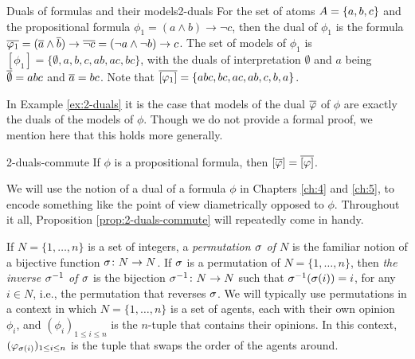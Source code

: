 \begin{xmpl}{Duals of formulas and their models}{2-duals}
	For the set of atoms $A=\{{a,b,c}\}$ and 
	the propositional formula $\phi_1 = (a\land b)\rightarrow\lnot c$, 
	then the dual of $\phi_1$ is the formula
	$\overline{\varphi_1} = (\overline{a}\land\overline{b})\rightarrow\overline{\lnot c} = (\lnot a \land \lnot b)\rightarrow c$.
	The set of models of $\phi_1$ is $[\phi_1]=\{\emptyset,a,b,c,ab,ac,bc\}$,
	with the duals of interpretation $\emptyset$ and $a$ being
	$\overline{\emptyset}=abc$ and
	$\overline{a} = bc$.
	Note that $\overline{[\varphi_1]}=\{abc,bc,ac,ab,c,b,a\}$.
\end{xmpl}

In Example \ref{ex:2-duals} it is the case 
that models of the dual $\overline{\varphi}$ of $\phi$
are exactly the duals of the models of $\phi$.
Though we do not provide a formal proof, 
we mention here that this holds more generally.

\begin{prp}{}{2-duals-commute}
	If $\phi$ is a propositional formula, then $[\overline{\varphi}] = \overline{[\varphi]}$.
\end{prp}

We will use the notion of a dual of a formula $\phi$ in 
Chapters \ref{ch:4} and \ref{ch:5}, to encode something like 
the point of view diametrically opposed to $\phi$. 
Throughout it all, Proposition \ref{prop:2-duals-commute}
will repeatedly come in handy.

If $N=\{1,\dots,n\}$ is a set of integers, a \emph{permutation $\sigma$ of $N$} 
is the familiar notion of a bijective function $\sigma\colon N\rightarrow N$.
If $\sigma$ is a permutation of $N=\{1,\dots,n\}$, then \emph{the inverse $\sigma^{-1}$ of $\sigma$}
is the bijection $\sigma^{-1}\colon N\rightarrow N$ such that $\sigma^{-1}(\sigma(i))=i$,
for any $i\in N$,
i.e., the permutation that reverses $\sigma$.
We will typically use permutations in a context in which
$N=\{1,\dots,n\}$ is a set of agents,
each with their own opinion $\phi_{i}$,
and $(\phi_{i})_{1\le i \le n}$ is the $n$-tuple 
that contains their opinions.
In this context, $(\varphi_{\sigma(i)})_{1\le i \le n}$
is the tuple that swaps the order of the agents around.

